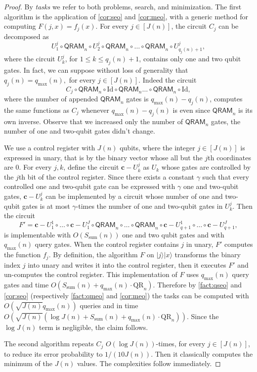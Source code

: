 \documentclass[12pt]{article}
\newcommand{\qr}{\mathrm{QR}}
\newcommand{\su}{\mathrm{sum}}
\newcommand{\id}{\mathrm{Id}}
\newcommand{\ket}[1]{|#1\rangle}
\newcommand{\cont}[1]{\mathbf{c-}#1}
\theoremstyle{definition}
\begin{document}
\begin{proof}
By {\em tasks} we refer to both problems, search, and minimization.
The first algorithm is the application of \cref{cor:seo} and \cref{cor:meo}, with a generic method for computing $F(j,x) = f_j(x)$.
For every $j \in [J(n)]$, the circuit $C_j$ can be decomposed as
$$
U^j_1 \circ \mathsf{QRAM}_n \circ U^j_2 \circ \mathsf{QRAM}_n \circ \ldots \circ \mathsf{QRAM}_n \circ U^j_{q_j(n)+1},
$$
where the circuit $U^j_k$, for $1 \leq k \leq q_j(n)+1$, contains only one and two qubit gates. 
In fact, we can suppose without loss of generality that $q_j(n)= q_{\max}(n),$ for every $j \in [J(n)]$. Indeed the circuit
$$
C_j \circ \mathsf{QRAM}_n \circ \id \circ  \mathsf{QRAM}_n  \ldots \circ \mathsf{QRAM}_n \circ \id,
$$
where the number of appended $\mathsf{QRAM}_n$ gates is $q_{\max}(n)  - q_j(n)$, computes the same functions as $C_j$ whenever $q_{\max}(n)  - q_j(n)$ is even since $\mathsf{QRAM}_n$ is its own inverse. Observe that we increased only the number of $\mathsf{QRAM}_n$ gates, the number of one and two-qubit gates didn't change.

We use a control register with $J(n)$ qubits, where the integer $j \in [J(n)]$ is expressed in unary, that is by the binary vector whose all but the $j$th coordinates are $0$.
For every $j,k$, define the circuit $\cont{U^j_k}$ as $U_k$ whose gates are controlled by the $j$th bit of the control register. Since there exists a constant $\gamma$ such that every controlled one and two-qubit gate can be expressed with $\gamma$ one and two-qubit gates, $\cont{U^j_k}$ can be implemented by a circuit whose number of one and two-qubit gates is at most $\gamma$-times the number of one and two-qubit gates in $U^j_k$.
Then the circuit
$$
F' = \cont{U^1_1} \circ \ldots \circ  \cont{U^J_1} \circ \mathsf{QRAM}_n \circ \ldots \circ \mathsf{QRAM}_n \circ \cont{U^1_{q+1}} 
\circ \ldots  \circ  \cont{U^J_{q+1}},
$$
is implementable with $O(S_{\su}(n))$ one and two qubit gates and with $q_{\max}(n)$ query gates. 
When the control register contains $j$ in unary, $F'$ computes the function $f_j$. By definition, the algorithm $F$ on $\ket{j} \ket{x} $ transforms the binary index $j$ into unary and writes it into the control register, then it executes $F'$ and un-computes the control register. This implementation of $F$ uses $q_{\max}(n)$ query gates and time $O(S_{\su}(n) + q_{\max}(n) \cdot \qr_n)$.
Therefore by \cref{fact:qseo} and \cref{cor:seo} (respectively \cref{fact:qmeo} and \cref{cor:meo}) the tasks can be computed with ${O}({\sqrt{J(n)} q_{\max}(n)})$ queries and in time $O(\sqrt{J(n)} ( \log J(n) +   S_{\su}(n) + q_{\max}(n) \cdot \qr_n)).$ 
Since the $\log J(n)$ term is negligible, the claim follows.

The second algorithm repeats $C_j$ $ O(\log J(n))$-times, for every $j \in [J(n)]$, to reduce its error probability to $1/(10J(n))$. Then it classically computes the minimum of the $J(n)$ values. The complexities follow immediately.
\end{proof}
\end{document}
